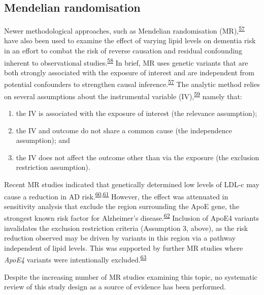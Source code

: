 \documentclass[a4paper, twoside]{templates/ociamthesis}
\providecommand{\tightlist}{%
  \setlength{\itemsep}{0pt}\setlength{\parskip}{0pt}}
\begin{document}
\hypertarget{mendelian-randomisation}{%
\subsection{Mendelian randomisation}\label{mendelian-randomisation}}

Newer methodological approaches, such as Mendelian randomisation (MR),\textsuperscript{\protect\hyperlink{ref-daveysmith2014}{57}} have also been used to examine the effect of varying lipid levels on dementia risk in an effort to combat the risk of reverse causation and residual confounding inherent to observational studies.\textsuperscript{\protect\hyperlink{ref-greenland2000}{58}} In brief, MR uses genetic variants that are both strongly associated with the exposure of interest and are independent from potential confounders to strengthen causal inference.\textsuperscript{\protect\hyperlink{ref-daveysmith2014}{57}} The analytic method relies on several assumptions about the instrumental variable (IV),\textsuperscript{\protect\hyperlink{ref-davies2018}{59}} namely that:

\begin{enumerate}
\def\labelenumi{\arabic{enumi}.}
\tightlist
\item
  the IV is associated with the exposure of interest (the relevance assumption);
\item
  the IV and outcome do not share a common cause (the independence assumption); and
\item
  the IV does not affect the outcome other than via the exposure (the exclusion restriction assumption).
\end{enumerate}

Recent MR studies indicated that genetically determined low levels of LDL-c may cause a reduction in AD risk.\textsuperscript{\protect\hyperlink{ref-larsson2017c}{60},\protect\hyperlink{ref-ostergaard2015}{61}} However, the effect was attenuated in sensitivity analysis that exclude the region surrounding the ApoE gene, the strongest known risk factor for Alzheimer's disease.\textsuperscript{\protect\hyperlink{ref-kim2009}{62}} Inclusion of ApoE4 variants invalidates the exclusion restriction criteria (Assumption 3, above), as the risk reduction observed may be driven by variants in this region via a pathway independent of lipid levels. This was supported by further MR studies where \emph{ApoE4} variants were intentionally excluded.\textsuperscript{\protect\hyperlink{ref-benn2017}{63}}

Despite the increasing number of MR studies examining this topic, no systematic review of this study design as a source of evidence has been performed.
\end{document}
